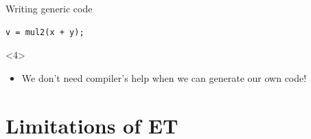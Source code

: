 \documentclass[@BEAMER_OPTIONS@]{beamer}
\begin{document}
\begin{frame}[fragile]{Writing generic code}
\begin{overlayarea}{\textwidth}{0.8\textheight}
\begin{onlyenv}
\begin{exampleblock}{}
\begin{lstlisting}[numbers=none]
v = mul2(x + y);
                \end{lstlisting}
            \end{exampleblock}
            \begin{uncoverenv}<4>
                \begin{itemize}
                    \item \alert{We don't need compiler's help when we can
                        generate our own code!}
                \end{itemize}
            \end{uncoverenv}
        \end{onlyenv}
    \end{overlayarea}
\end{frame}

\section{Limitations of ET}
\end{document}

